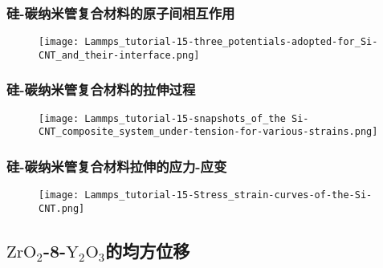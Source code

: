 
\frame
{
	\frametitle{硅-碳纳米管复合材料的原子间相互作用}
\begin{figure}[h!]
\centering
\vskip -5pt
\texttt{[image: Lammps\_tutorial-15-three\_potentials-adopted-for\_Si-CNT\_and\_their-interface.png]}
\caption{\fontsize{6.2pt}{5.2pt}}%
\label{LAMMPS_Potential-Si-CNT}
\end{figure}
}

\frame
{
	\frametitle{硅-碳纳米管复合材料的拉伸过程}
\begin{figure}[h!]
\centering
\vskip -10pt
\texttt{[image: Lammps\_tutorial-15-snapshots\_of\_the Si-CNT\_composite\_system\_under-tension-for-various-strains.png]}
\caption{\fontsize{6.2pt}{5.2pt}}%
\label{LAMMPS_Si_CNT-under-tension}
\end{figure}
}

\frame
{
	\frametitle{硅-碳纳米管复合材料拉伸的应力-应变}
\begin{figure}[h!]
\centering
\vskip -5pt
\texttt{[image: Lammps\_tutorial-15-Stress\_strain-curves-of-the-Si-CNT.png]}
\caption{\fontsize{6.2pt}{5.2pt}}%
\label{LAMMPS_Stress-train-curve}
\end{figure}
}

\subsection{$\mathrm{ZrO}_2$-\rm{8}-$\mathrm{Y}_2\mathrm{O}_3$的均方位移}

